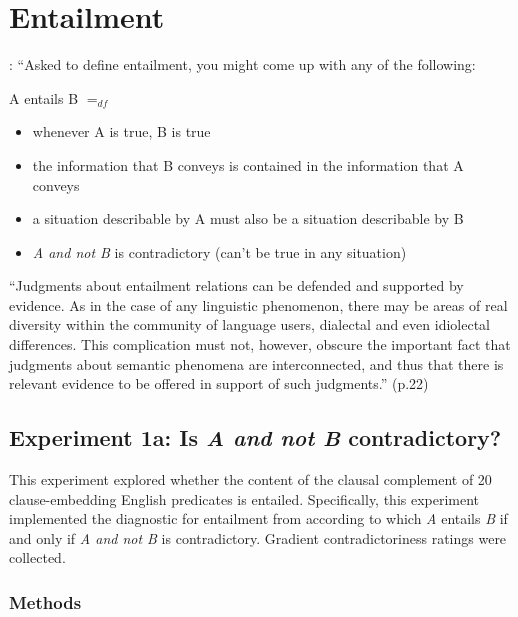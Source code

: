 \documentclass[11pt,fleqn]{article}
\newcommand{\6}{\mbox{$[\hspace*{-.6mm}[$}}
\newcommand{\9}{\mbox{$]\hspace*{-.6mm}]$}}
\begin{document}
\section{Entailment}\label{s-entailment}

\citealt[19f.]{ccmg90}: ``Asked to define entailment, you might come up with any of the following:

\begin{exe}
\ex A entails B $=_{df}$

\begin{itemize}[leftmargin=5ex,topsep=0pt,itemsep=-2pt]

\item whenever A is true, B is true

\item the information that B conveys is contained in the information that A conveys

\item a situation describable by A must also be a situation describable by B

\item {\em A and not B} is contradictory (can't be true in any situation)

\end{itemize}
\end{exe}

``Judgments about entailment relations can be defended and supported by evidence. As in the case of any linguistic phenomenon, there may be areas of real diversity within the community of language users, dialectal and even idiolectal differences. This complication must not, however, obscure the important fact that judgments about semantic phenomena are interconnected, and thus that there is relevant evidence to be offered in support of such judgments.'' (p.22)

\subsection{Experiment 1a: Is {\em A and not B} contradictory?}

This experiment explored whether the content of the clausal complement of 20 clause-embedding English predicates is entailed. Specifically, this experiment implemented the diagnostic for entailment from \citealt{ccmg90} according to which {\em A} entails {\em B} if and only if {\em A and not B} is contradictory. Gradient contradictoriness ratings were collected.

\subsubsection{Methods}\label{s-methods-2}
\end{document}
